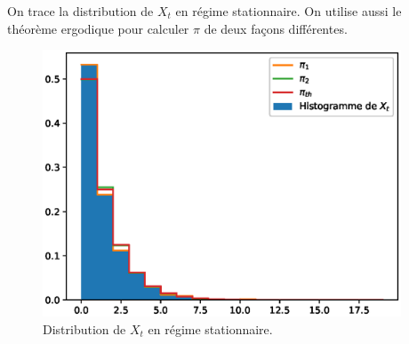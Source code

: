 \documentclass[12pt,a4paper]{article}
\begin{document}
On trace la distribution de $X_t$ en régime stationnaire. On utilise aussi le théorème ergodique pour calculer $\pi$ de deux façons différentes.

\begin{figure}[H]
	\centering
	\includegraphics[width=0.95\textwidth]{q3.eps}
	\caption{Distribution de $X_t$ en régime stationnaire.}
\end{figure}
\end{document}

